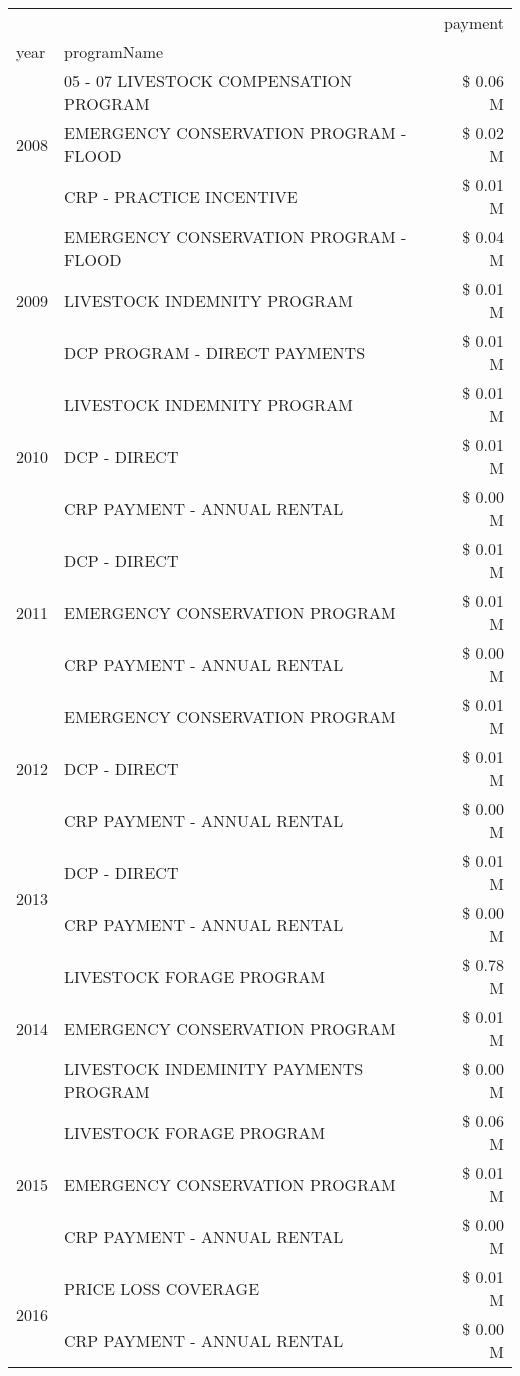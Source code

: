 \begin{tabular}{llr}
\toprule
 &  & payment \\
year & programName &  \\
\midrule
\multirow[t]{3}{*}{2008} & 05 - 07 LIVESTOCK COMPENSATION PROGRAM & \$ 0.06 M \\
 & EMERGENCY CONSERVATION PROGRAM - FLOOD & \$ 0.02 M \\
 & CRP - PRACTICE INCENTIVE & \$ 0.01 M \\
\cline{1-3}
\multirow[t]{3}{*}{2009} & EMERGENCY CONSERVATION PROGRAM - FLOOD & \$ 0.04 M \\
 & LIVESTOCK INDEMNITY PROGRAM & \$ 0.01 M \\
 & DCP PROGRAM - DIRECT PAYMENTS & \$ 0.01 M \\
\cline{1-3}
\multirow[t]{3}{*}{2010} & LIVESTOCK INDEMNITY PROGRAM & \$ 0.01 M \\
 & DCP - DIRECT & \$ 0.01 M \\
 & CRP PAYMENT - ANNUAL RENTAL & \$ 0.00 M \\
\cline{1-3}
\multirow[t]{3}{*}{2011} & DCP - DIRECT & \$ 0.01 M \\
 & EMERGENCY CONSERVATION PROGRAM & \$ 0.01 M \\
 & CRP PAYMENT - ANNUAL RENTAL & \$ 0.00 M \\
\cline{1-3}
\multirow[t]{3}{*}{2012} & EMERGENCY CONSERVATION PROGRAM & \$ 0.01 M \\
 & DCP - DIRECT & \$ 0.01 M \\
 & CRP PAYMENT - ANNUAL RENTAL & \$ 0.00 M \\
\cline{1-3}
\multirow[t]{2}{*}{2013} & DCP - DIRECT & \$ 0.01 M \\
 & CRP PAYMENT - ANNUAL RENTAL & \$ 0.00 M \\
\cline{1-3}
\multirow[t]{3}{*}{2014} & LIVESTOCK FORAGE PROGRAM & \$ 0.78 M \\
 & EMERGENCY CONSERVATION PROGRAM & \$ 0.01 M \\
 & LIVESTOCK INDEMINITY PAYMENTS PROGRAM & \$ 0.00 M \\
\cline{1-3}
\multirow[t]{3}{*}{2015} & LIVESTOCK FORAGE PROGRAM & \$ 0.06 M \\
 & EMERGENCY CONSERVATION PROGRAM & \$ 0.01 M \\
 & CRP PAYMENT - ANNUAL RENTAL & \$ 0.00 M \\
\cline{1-3}
\multirow[t]{2}{*}{2016} & PRICE LOSS COVERAGE & \$ 0.01 M \\
 & CRP PAYMENT - ANNUAL RENTAL & \$ 0.00 M \\

\end{tabular}
